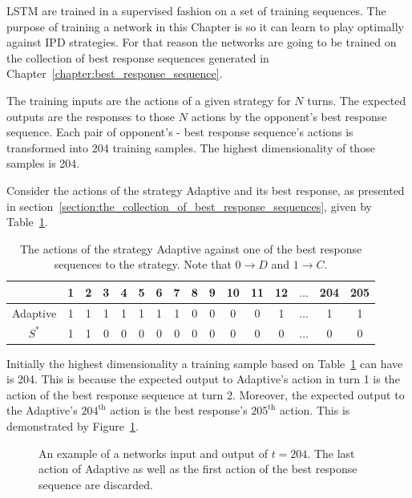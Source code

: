 LSTM are trained in a supervised fashion on a set of training sequences. The
purpose of training a network in this Chapter is so it can learn to play
optimally against IPD strategies. For that reason the networks are going to be
trained on the collection of best response sequences generated in
Chapter~\ref{chapter:best_response_sequence}.

The training inputs are the actions of a given strategy for \(N\) turns. The
expected outputs are the responses to those \(N\) actions by the opponent's best
response sequence. Each pair of opponent's - best response sequence's actions
is transformed into 204
training samples. The highest dimensionality of those samples is 204.

Consider the actions of the strategy Adaptive and its best response, as
presented in section~\ref{section:the_collection_of_best_response_sequences},
given by Table~\ref{table:adaptive_vs_best_response_binary_lstm}.

\begin{table}[htbp]
    \centering
    \begin{tabular}{cccccccccccccccc}
        & \textbf{1} & \textbf{2} & \textbf{3} & \textbf{4}  & \textbf{5} & \textbf{6} & \textbf{7} & \textbf{8} & \textbf{9} & \textbf{10} & \textbf{11} &  \textbf{12} & \(\dots\)  & \textbf{204} &  \textbf{205} \\ 
        \midrule
        Adaptive & 1 & 1 & 1 & 1 & 1 & 1 & 1 & 0 & 0 & 0 & 0& 1& \(\dots\) & 1 & 1 \\
        \(S^*\) & 1 & 1 & 0 & 0 & 0 & 0 & 0 & 0 & 0 & 0 & 0 & 0& \(\dots\) & 0 & 0 \\ \bottomrule
    \end{tabular}
    \caption{The actions of the strategy Adaptive against one of the best response sequences
    to the strategy. Note that \(0 \to D\) and \(1 \to C\).}\label{table:adaptive_vs_best_response_binary_lstm}
\end{table}

Initially the highest dimensionality a training sample based on
Table~\ref{table:adaptive_vs_best_response_binary_lstm} can have is 204.
This is because the expected output to Adaptive's action in turn 1 is
the action of the best response sequence at turn 2. Moreover, the expected
output to the Adaptive's \(204^{\text{th}}\) action is the best response's
\(205^{\text{th}}\) action. This is demonstrated by
Figure~\ref{fig:input_output_example}.

\begin{figure}[!htbp]
    \centering
    
    \caption{An example of a networks input and output of \(t=204\). The last
    action of Adaptive as well as the first action of the best
    response sequence are discarded.}\label{fig:input_output_example}
\end{figure}

